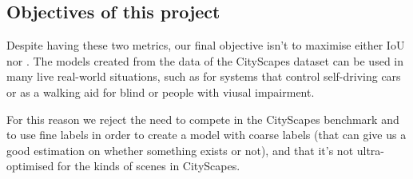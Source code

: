 \subsection{Objectives of this project}

Despite having these two metrics, our final objective isn't to maximise either IoU nor \iiouc{}.
The models created from the data of the CityScapes dataset can be used in many live real-world situations, such as for systems that control self-driving cars or as a walking aid for blind or people with viusal impairment.

For this reason we reject the need to compete in the CityScapes benchmark\cite{cityscapes_benchmark} and to use fine labels in order to create a model with coarse labels (that can give us a good estimation on whether something exists or not), and that it's not ultra-optimised for the kinds of scenes in CityScapes.
